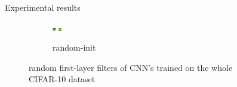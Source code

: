 \documentclass[final]{beamer}
\newlength{\sepwid}
\newlength{\onecolwid}
\begin{document}
\begin{frame}[t]
\begin{columns}[t]
\begin{column}{\onecolwid}
\begin{block}{Experimental results}
\begin{figure}
\begin{subfigure}{.4\linewidth}
\includegraphics[width=0.1\linewidth]{graphics/cifar_filters/random_08.png}\hspace{0.05\linewidth}
\includegraphics[width=0.1\linewidth]{graphics/cifar_filters/random_09.png}
\caption{random-init}
\end{subfigure}

\caption{random first-layer filters of CNN's trained on the whole CIFAR-10 dataset}

\end{figure}

\end{block}

\end{column} %

\begin{column}{\sepwid}\end{column} %

\begin{column}{\onecolwid} %



\end{column}
\end{columns}
\end{frame}
\end{document}
